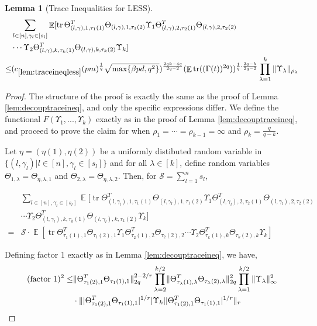 \documentclass[11pt]{amsart}
\numberwithin{equation}{section}
\numberwithin{equation}{section}
\DeclareMathOperator{\E}{\mathbb{E}}
\DeclareMathOperator*{\tr}{tr}
\DeclarePairedDelimiter{\norm}{\lVert}{\rVert}
\newtheorem{lemma}[theorem]{Lemma}
\theoremstyle{remark}
\theoremstyle{definition}
\begin{document}
\begin{lemma} [Trace Inequalities for LESS]
\begin{align*}
    &\sum_{l \in [n], \gamma_l \in [s_l]} \E[ \tr \Theta_{(l,\gamma), 1, \tau_1(1)}^T\Theta_{(l,\gamma), 1, \tau_1(2)}
	\Upsilon_1\Theta_{(l,\gamma), 2, \tau_2(1)}^T\Theta_{(l,\gamma), 2, \tau_2(2)} \\&\cdots
	\Upsilon_2\Theta_{(l,\gamma), k, \tau_k(1)}^T\Theta_{(l,\gamma), k, \tau_k(2)}\Upsilon_k]  \\ \le &
     (c_{\ref*{lem:traceineqless}}(pm)^\frac{1}{q}\sqrt{\max\{\beta pd,q^2\}})^{\frac{2qk-4q}{2q-2}} (\E \tr((\Gamma(t))^{2q}))^{\frac{1}{q} \cdot \frac{2q-k}{2q-2}} \prod\limits_{\lambda  = 1}^{k} {\norm{\Upsilon_\lambda }_{\rho_{\lambda}}} 
\end{align*}


\end{lemma}
\begin{proof}
    The structure of the proof is exactly the same as the proof of Lemma \ref{lem:decouptraceineq}, and only the specific expressions differ. We define the functional $F(\Upsilon_1,...,\Upsilon_k)$ exactly as in the proof of Lemma \ref{lem:decouptraceineq}, and proceed to prove the claim for when  $\rho_1= \cdots =\rho_{k-1}=\infty$ and $\rho_k=\frac{q}{q-k}$. 
    
    
    Let $\eta = (\eta(1), \eta(2))$ be a uniformly distibuted random variable in $\{ (l, \gamma_l) | l \in [n], \gamma_l \in [s_l] \}$ and for all $\lambda \in [k]$, define random variables $\Theta_{1, \lambda} = \Theta_{\eta, \lambda, 1}$ and $\Theta_{2, \lambda} = \Theta_{\eta, \lambda, 2}$. Then, for $\mathcal{S} = \sum_{l=1}^n s_l$,
    
    \begin{align*}
        &\sum_{l \in [n], \gamma_l \in [s_l]} \E[ \tr \Theta_{(l,\gamma_l), 1, \tau_1(1)}^T\Theta_{(l,\gamma_l), 1, \tau_1(2)}
	\Upsilon_1\Theta_{(l,\gamma_l), 2, \tau_2(1)}^T\Theta_{(l,\gamma_l), 2, \tau_2(2)}\\&\cdots
	\Upsilon_2\Theta_{(l,\gamma_l), k, \tau_k(1)}^T\Theta_{(l,\gamma_l), k, \tau_k(2)}\Upsilon_k] \\ =
    &\mathcal{S} \cdot \E[
	\tr \Theta_{\tau_{1}(1),1}^T\Theta_{\tau_{1}(2),1}
	\Upsilon_1\Theta_{\tau_{2}(1),2}^T\Theta_{\tau_{2}(2),2}\cdots
	\Upsilon_2\Theta_{\tau_{k}(1),k}^T\Theta_{\tau_{k}(2),k}\Upsilon_k]
    \end{align*}

Defining factor 1 exactly as in Lemma \ref{lem:decouptraceineq}, we have,
\begin{align*}
(\text{factor 1})^2 \le & \norm{\Theta_{\tau_{1}(2),1}^T\Theta_{\tau_{1}(1),1}}_{2q}^{2-2/r} \prod\limits_{\lambda  = 2}^{k/2}\norm{\Theta_{\tau_{\lambda}(1),\lambda}^T\Theta_{\tau_{\lambda}(2),\lambda}}_{2q}^2\prod\limits_{\lambda  = 1}^{k/2} {\norm{\Upsilon_\lambda }_{\infty}^2} \\ &\cdot \norm{|\Theta_{\tau_{1}(2),1}^T\Theta_{\tau_{1}(1),1}|^{1/r} |\Upsilon_k| |\Theta_{\tau_{1}(2),1}^T\Theta_{\tau_{1}(1),1}|^{1/r}}_r
\end{align*}


\end{proof}
\end{document}
